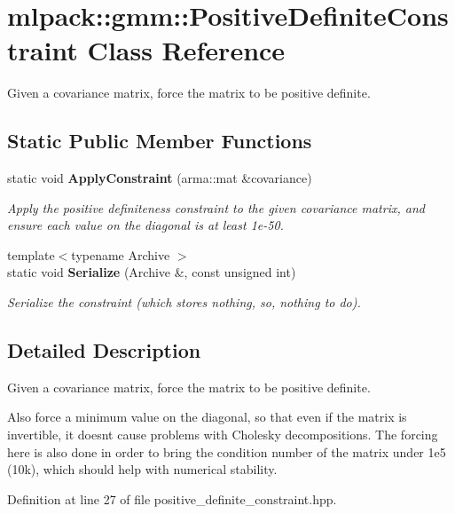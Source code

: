 \section{mlpack\+:\+:gmm\+:\+:Positive\+Definite\+Constraint Class Reference}
\label{classmlpack_1_1gmm_1_1PositiveDefiniteConstraint}


Given a covariance matrix, force the matrix to be positive definite.  


\subsection*{Static Public Member Functions}
\begin{DoxyCompactItemize}
\item 
static void {\bf Apply\+Constraint} (arma\+::mat \&covariance)
\begin{DoxyCompactList}\small\item\em Apply the positive definiteness constraint to the given covariance matrix, and ensure each value on the diagonal is at least 1e-\/50. \end{DoxyCompactList}\item 
{\footnotesize template$<$typename Archive $>$ }\\static void {\bf Serialize} (Archive \&, const unsigned int)
\begin{DoxyCompactList}\small\item\em Serialize the constraint (which stores nothing, so, nothing to do). \end{DoxyCompactList}\end{DoxyCompactItemize}


\subsection{Detailed Description}
Given a covariance matrix, force the matrix to be positive definite. 

Also force a minimum value on the diagonal, so that even if the matrix is invertible, it doesn\textquotesingle{}t cause problems with Cholesky decompositions. The forcing here is also done in order to bring the condition number of the matrix under 1e5 (10k), which should help with numerical stability. 

Definition at line 27 of file positive\+\_\+definite\+\_\+constraint.\+hpp.




